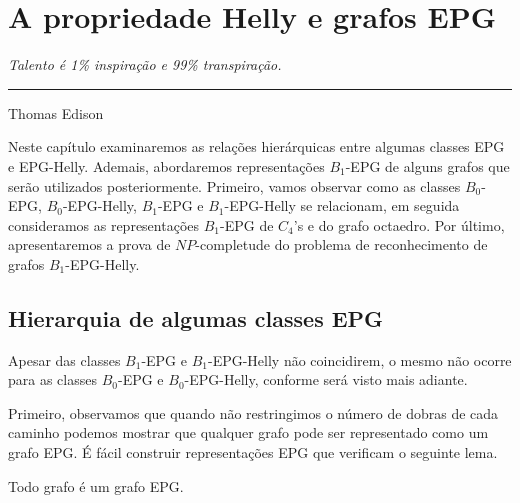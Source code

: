 \chapter{A propriedade Helly e grafos EPG}\label{cap:capiii}

\begin{flushright}
\begin{minipage}[t][0cm][b]{0.47\textwidth}
\emph{
Talento é 1\% inspiração e 99\% transpiração. }
\end{minipage}

\rule[0cm]{7cm}{0.03cm}%

Thomas Edison
\end{flushright}

Neste capítulo examinaremos as relações hierárquicas entre algumas classes EPG e EPG-Helly. Ademais, abordaremos representações $B_1$-EPG de alguns grafos que serão utilizados posteriormente. Primeiro, vamos observar como as classes $B_0$-EPG, $B_0$-EPG-Helly, $B_1$-EPG e $B_1$-EPG-Helly se relacionam, em seguida consideramos as representações $B_1$-EPG de $C_4$'s e do grafo octaedro. Por último, apresentaremos a prova de $NP$-completude do problema de reconhecimento de grafos $B_1$-EPG-Helly.


\section{Hierarquia de algumas classes EPG}

Apesar das classes $B_1$-EPG e $ B_1$-EPG-Helly não coincidirem,  o mesmo não ocorre para as classes $ B_0$-EPG e $ B_0$-EPG-Helly, conforme será visto mais adiante.

Primeiro, observamos que quando não restringimos o número de dobras de cada caminho podemos mostrar que qualquer grafo pode ser representado como um grafo EPG.
É fácil construir representações EPG que verificam o seguinte lema. 

 
 
 \begin{lema} \cite{golumbic2009} \label{lem:todoGrafoEpg}
 Todo grafo é um grafo EPG.
 \end{lema}
 
